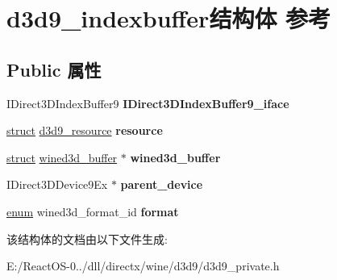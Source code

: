 \hypertarget{structd3d9__indexbuffer}{}\section{d3d9\+\_\+indexbuffer结构体 参考}
\label{structd3d9__indexbuffer}
\subsection*{Public 属性}
\begin{DoxyCompactItemize}
\item 
\mbox{\label{structd3d9__indexbuffer_ad39c311394fa5e53305e3b69d127c235}} 
I\+Direct3\+D\+Index\+Buffer9 {\bfseries I\+Direct3\+D\+Index\+Buffer9\+\_\+iface}
\item 
\mbox{\label{structd3d9__indexbuffer_ae0d648cfa27f22e4eadb38e8a3561e23}} 
\hyperlink{interfacestruct}{struct} \hyperlink{structd3d9__resource}{d3d9\+\_\+resource} {\bfseries resource}
\item 
\mbox{\label{structd3d9__indexbuffer_a708d7c92c5d6bdc9c5c87b9090b2759c}} 
\hyperlink{interfacestruct}{struct} \hyperlink{structwined3d__buffer}{wined3d\+\_\+buffer} $\ast$ {\bfseries wined3d\+\_\+buffer}
\item 
\mbox{\label{structd3d9__indexbuffer_a2680097862652ea410c654684e866247}} 
I\+Direct3\+D\+Device9\+Ex $\ast$ {\bfseries parent\+\_\+device}
\item 
\mbox{\label{structd3d9__indexbuffer_a2901510482e13b7e4f2d7d57adcf40e0}} 
\hyperlink{interfaceenum}{enum} wined3d\+\_\+format\+\_\+id {\bfseries format}
\end{DoxyCompactItemize}


该结构体的文档由以下文件生成\+:\begin{DoxyCompactItemize}
\item 
E\+:/\+React\+O\+S-\/0../dll/directx/wine/d3d9/d3d9\+\_\+private.\+h\end{DoxyCompactItemize}
